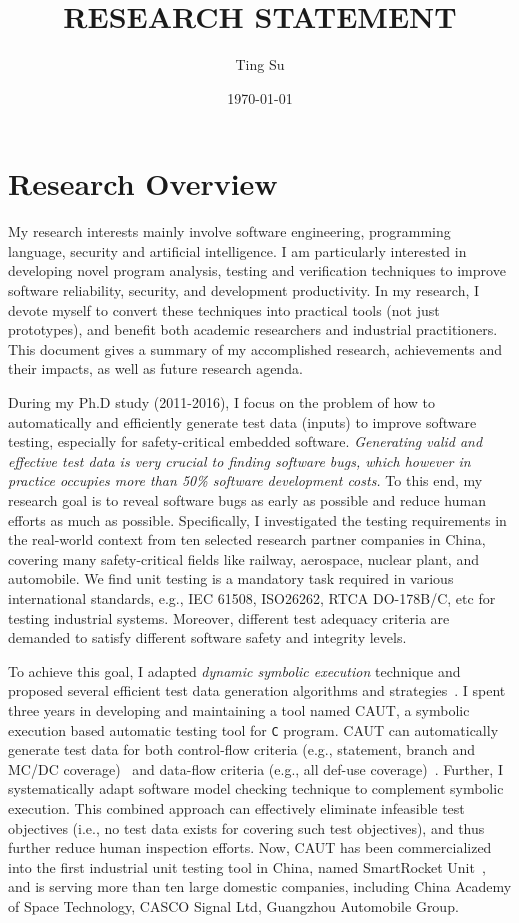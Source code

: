 \documentclass[a4paper]{article}
\title{RESEARCH STATEMENT}
\author{Ting Su}
\date{\today}
\begin{document}
\fontsize{12}{15}
\selectfont
\maketitle

\section{Research Overview}

My research interests mainly involve software engineering, programming language, security and artificial intelligence. I am particularly interested in developing novel program analysis, testing and verification techniques to improve software reliability, security, and development productivity. In my research, I devote myself to convert these techniques into practical tools (not just prototypes), and benefit both academic researchers and industrial practitioners. This document gives a summary of my accomplished
research, achievements and their impacts, as well as future research agenda.

During my Ph.D study (2011-2016), I focus on the problem of how to automatically and efficiently generate test data (inputs) to improve software testing, especially for safety-critical embedded software. \emph{Generating valid and effective test data is very crucial to finding software bugs, which however in practice occupies more than 50\% software development costs.}
To this end, my research goal is to reveal software bugs as early as possible and reduce human efforts as much as possible. 
Specifically, I investigated the testing requirements in the real-world context from ten selected research partner companies in China, covering many safety-critical fields like railway, aerospace, nuclear plant, and automobile.
We find unit testing is a mandatory task required in various international standards, e.g., IEC 61508, ISO26262, RTCA DO-178B/C, etc for testing industrial systems. Moreover, different test adequacy criteria are demanded to satisfy different software safety and integrity levels.

To achieve this goal, I adapted \emph{dynamic symbolic execution} technique and proposed several efficient test data generation algorithms and strategies~\cite{sere14,icse15,csur17,scis16,smartunit}.
I spent three years in developing and maintaining a tool named CAUT, a symbolic execution based automatic testing tool for \texttt{C} program. CAUT can automatically generate test data for both control-flow criteria (e.g., statement, branch and MC/DC coverage)~\cite{sere14} and data-flow criteria (e.g., all def-use coverage)~\cite{icse15,csur17}.
Further, I systematically adapt software model checking technique to complement symbolic execution. This combined approach can effectively eliminate infeasible test objectives (i.e., no test data exists for covering such test objectives), and thus further reduce human inspection efforts. Now, CAUT has been commercialized into the first industrial unit testing tool in China, named SmartRocket Unit~\cite{smartunit}, and is serving more than ten large domestic companies, including China Academy of Space Technology, CASCO Signal Ltd, Guangzhou Automobile Group.
\end{document}
